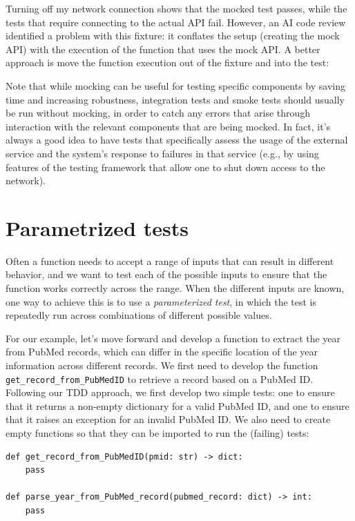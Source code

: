 Turning off my network connection shows that the mocked test passes, while the tests that require connecting to the actual API fail.
However, an AI code review identified a problem with this fixture: it conflates the setup (creating the mock API) with the execution of the function that uses the mock API.
A better approach is move the function execution out of the fixture and into the test:



Note that while mocking can be useful for testing specific components by saving time and increasing robustness, integration tests and smoke tests should usually be run without mocking, in order to catch any errors that arise through interaction with the relevant components that are being mocked.
In fact, it's always a good idea to have tests that specifically assess the usage of the external service and the system's response to failures in that service (e.g., by using features of the testing framework that allow one to shut down access to the network).

\section{Parametrized tests}

Often a function needs to accept a range of inputs that can result in different behavior, and we want to test each of the possible inputs to ensure that the function works correctly across the range.
When the different inputs are known, one way to achieve this is to use a \textit{parameterized test}, in which the test is repeatedly run across combinations of different possible values.

For our example, let's move forward and develop a function to extract the year from PubMed records, which can differ in the specific location of the year information across different records.
We first need to develop the function \texttt{get\_record\_from\_PubMedID} to retrieve a record based on a PubMed ID.
Following our TDD approach, we first develop two simple tests: one to ensure that it returns a non-empty dictionary for a valid PubMed ID, and one to ensure that it raises an exception for an invalid PubMed ID.
We also need to create empty functions so that they can be imported to run the (failing) tests:

\begin{lstlisting}[style=Python]
def get_record_from_PubMedID(pmid: str) -> dict:
    pass

def parse_year_from_PubMed_record(pubmed_record: dict) -> int:
    pass
\end{lstlisting}

